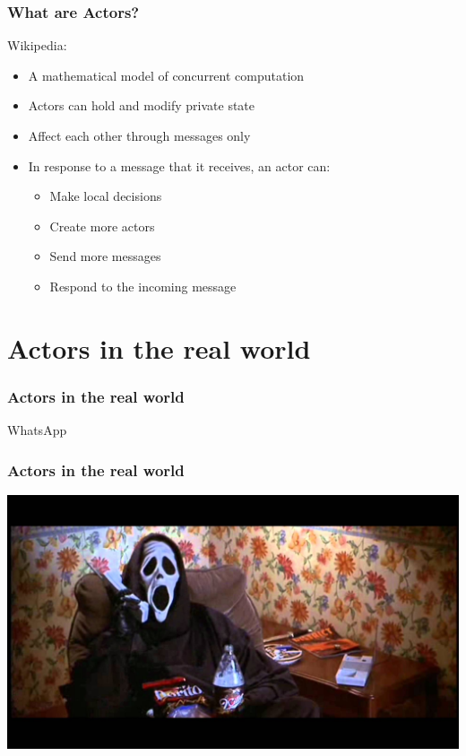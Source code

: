 \documentclass{beamer}
\begin{document}

\begin{frame}
\frametitle{What are Actors?}
Wikipedia:
\begin{itemize}
\item A mathematical model of concurrent computation
\item Actors can hold and modify private state
\item Affect each other through messages only
\item In response to a message that it receives, an actor can:
\begin{itemize}
\item Make local decisions
\item Create more actors
\item Send more messages
\item Respond to the incoming message
\end{itemize}
\end{itemize}
\end{frame}


\section{Actors in the real world}

\begin{frame}
\frametitle{Actors in the real world}
\Huge{\centerline{WhatsApp}}
\end{frame}



\begin{frame}
\frametitle{Actors in the real world}
\includegraphics[width=0.8\linewidth]{./images/whatsup.jpg}
\end{frame}
\end{document}
